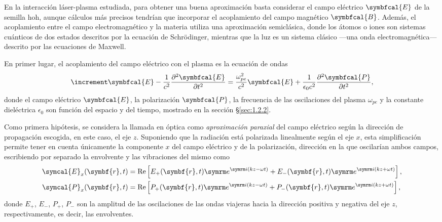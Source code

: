 En la interacción láser-plasma estudiada, para obtener una buena aproximación basta considerar el campo eléctrico $\symbfcal{E}$ de la semilla \acrshort{hoh}, aunque cálculos más precisos tendrían que incorporar el acoplamiento del campo magnético $\symbfcal{B}$. Además, el acoplamiento entre el campo electromagnético y la materia utiliza una aproximación semiclásica, donde los átomos o iones son sistemas cuánticos de dos estados descritos por la ecuación de Schrödinger, mientras que la luz es un sistema clásico ---una onda electromagnética--- descrito por las ecuaciones de Maxwell.

En primer lugar, el acoplamiento del campo eléctrico con el plasma es la ecuación de ondas 
\begin{equation}\label{eq:3.1}
  \laplacian \symbfcal{E} - \frac{1}{c^{2}}\pdvN{\symbfcal{E}}{t}{2} = \frac{\omega^{2}_{pe}}{c^{2}}\symbfcal{E} + \frac{1}{\epsilon_{0}c^{2}}\pdvN{\symbfcal{P}}{t}{2},
\end{equation}
donde el campo eléctrico $\symbfcal{E}$, la polarización $\symbfcal{P}$, la frecuencia de las oscilaciones del plasma $\omega_{pe}$ y la constante dieléctrica $\epsilon_{0}$ son función del espacio y del tiempo, mostrado en la sección \S\ref{sec:1.2.2}. 

Como primera hipótesis, se considera la llamada en óptica\autocite{bornPrinciplesOptics60th2019} como \emph{aproximación paraxial} del campo eléctrico según la dirección de propagación escogida, en este caso, el eje $z$. Suponiendo que la radiación está polarizada linealmente según el eje $x$, esta simplificación permite tener en cuenta únicamente la componente $x$ del campo eléctrico y de la polarización, dirección en la que oscilarían ambos campos, escribiendo por separado la envolvente y las vibraciones del mismo como
\begin{align}
  \label{eq:3.2a}
  \symcal{E}_{x}(\symbf{r},t) &= \RE \left[E_{+}(\symbf{r},t)\eu^{\iu (kz - \omega t)} + E_{-}(\symbf{r},t)\eu^{\iu (kz + \omega t)}\right], \\
  \label{eq:3.2b}
  \symcal{P}_{x}(\symbf{r},t) &= \RE \left[P_{+}(\symbf{r},t)\eu^{\iu (kz - \omega t)} + P_{-}(\symbf{r},t)\eu^{\iu (kz + \omega t)}\right], 
\end{align}
donde $E_{+}$, $E_{-}$, $P_{+}$, $P_{-}$ son la amplitud de las oscilaciones de las ondas viajeras hacia la dirección positiva y negativa del eje $z$, respectivamente, es decir, las envolventes. 

